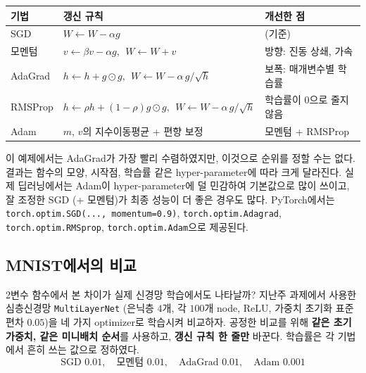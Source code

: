 \documentclass[11pt,a4paper]{article}
\begin{document}
\begin{keybox}[매개변수 갱신 기법 정리]
\begin{center}
\begin{tabular}{@{}lll@{}}
\toprule
기법 & 갱신 규칙 & 개선한 점 \\
\midrule
SGD & $W\leftarrow W-\alpha g$ & (기준) \\[3pt]
모멘텀 & $v\leftarrow\beta v-\alpha g,\ \ W\leftarrow W+v$ & 방향: 진동 상쇄, 가속 \\[3pt]
AdaGrad & $h\leftarrow h+g\odot g,\ \ W\leftarrow W-\alpha\,g/\sqrt h$ & 보폭: 매개변수별 학습률 \\[3pt]
RMSProp & $h\leftarrow\rho h+(1-\rho)g\odot g,\ \ W\leftarrow W-\alpha\,g/\sqrt h$ & 학습률이 $0$으로 줄지 않음 \\[3pt]
Adam & $m$, $v$의 지수이동평균 + 편향 보정 & 모멘텀 + RMSProp \\
\bottomrule
\end{tabular}
\end{center}
\end{keybox}

\begin{remarkbox}
이 예제에서는 AdaGrad가 가장 빨리 수렴하였지만, 이것으로 순위를 정할 수는 없다.
결과는 함수의 모양, 시작점, 학습률 같은 hyper-parameter에 따라 크게 달라진다.
실제 딥러닝에서는 Adam이 hyper-parameter에 덜 민감하여 기본값으로 많이 쓰이고,
잘 조정한 SGD (+ 모멘텀)가 최종 성능이 더 좋은 경우도 많다.
PyTorch에서는 \texttt{torch.optim.SGD(..., momentum=0.9)}, \texttt{torch.optim.Adagrad},
\texttt{torch.optim.RMSprop}, \texttt{torch.optim.Adam}으로 제공된다.
\end{remarkbox}



\subsection{MNIST에서의 비교}\label{sec:mnistopt}

2변수 함수에서 본 차이가 실제 신경망 학습에서도 나타날까?
지난주 과제에서 사용한 심층신경망 \texttt{MultiLayerNet}
(은닉층 $4$개, 각 $100$개 node, ReLU, 가중치 초기화 표준편차 $0.05$)을
네 가지 optimizer로 학습시켜 비교하자.
공정한 비교를 위해 \textbf{같은 초기 가중치, 같은 미니배치 순서}를 사용하고,
\textbf{갱신 규칙 한 줄만} 바꾼다.
학습률은 각 기법에서 흔히 쓰는 값으로 정하였다.
\[
\text{SGD }0.01,\quad \text{모멘텀 }0.01,\quad \text{AdaGrad }0.01,\quad \text{Adam }0.001
\]
\end{document}
